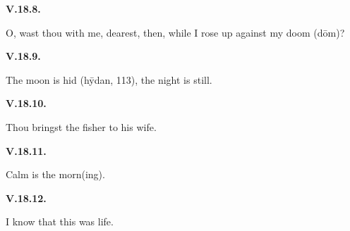 \par\begin{minipage}{\linewidth}\raggedright
\textbf{V.18.8.}

O, wast thou with me, dearest, then, while I rose up against my doom (dōm)?

\end{minipage}\par\addvspace{4pt}

\par\begin{minipage}{\linewidth}\raggedright
\textbf{V.18.9.}

The moon is hid (hȳdan, 113), the night is still.

\end{minipage}\par\addvspace{4pt}

\par\begin{minipage}{\linewidth}\raggedright
\textbf{V.18.10.}

Thou bringst the fisher to his wife.

\end{minipage}\par\addvspace{4pt}

\par\begin{minipage}{\linewidth}\raggedright
\textbf{V.18.11.}

Calm is the morn(ing).

\end{minipage}\par\addvspace{4pt}

\par\begin{minipage}{\linewidth}\raggedright
\textbf{V.18.12.}

I know that this was life.

\end{minipage}\par\addvspace{4pt}

